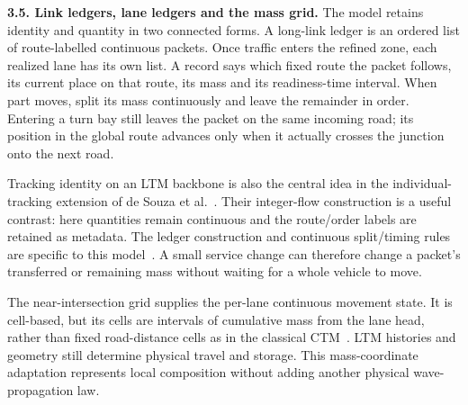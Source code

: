 \documentclass[10pt,a4paper]{article}
\begin{document}
\textbf{3.5. Link ledgers, lane ledgers and the mass grid.}
The model retains identity and quantity in two connected forms.
A long-link ledger is an ordered list of route-labelled continuous
packets. Once traffic enters the refined zone, each realized lane has
its own list. A record says which fixed route the packet follows, its
current place on that route, its mass and its readiness-time interval.
When part moves, split its mass continuously and leave the remainder
in order. Entering a turn bay still leaves the packet on the same incoming road;
its position in the global route advances only when it actually crosses
the junction onto the next road.

Tracking identity on an LTM backbone is also the central idea in the
individual-tracking extension of de Souza et al.~\cite{tracking}.
Their integer-flow construction is a useful contrast: here quantities
remain continuous and the route/order labels are retained as metadata.
The ledger construction and continuous split/timing rules are specific
to this model~\cite{m1}. A small service change can therefore change a
packet's transferred or remaining mass without waiting for a whole
vehicle to move.

The near-intersection grid supplies the per-lane continuous movement
state. It is cell-based, but its cells are intervals of cumulative mass
from the lane head, rather than fixed road-distance cells as in the
classical CTM~\cite{ctm}. LTM histories and geometry still determine
physical travel and storage. This mass-coordinate adaptation represents
local composition without adding another physical wave-propagation law.
\end{document}
